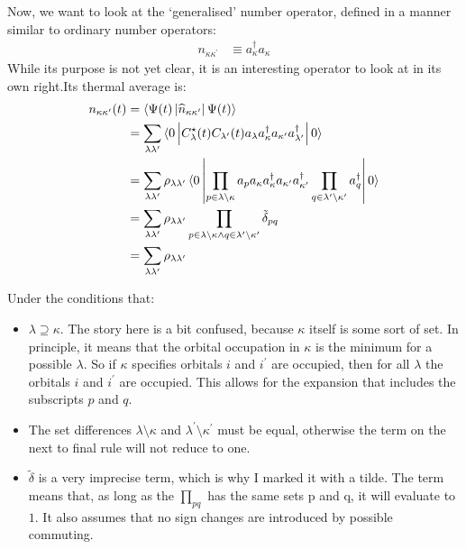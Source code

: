 Now, we want to look at the `generalised' number operator, defined in a manner similar to ordinary number operators: 
\begin{align}
n_{\kappa\kappa^\prime} &\equiv a^\dagger_\kappa a_\kappa \label{eq:gennum}
\end{align}
While its purpose is not yet clear, it is an interesting operator to look at in its own right.Its thermal average is:
\begin{align*}
n_{\kappa\kappa^\prime} (t) &= \braket{\Psi (t) \left| \widehat{n}_{\kappa\kappa^\prime}\right|\Psi (t)} \\
&=\sum_{\lambda\lambda^\prime} \braket{0\left| C_\lambda^\star (t) C_{\lambda^\prime} (t) a_\lambda a_\kappa^\dagger a_{\kappa^\prime} a_{\lambda^\prime}^\dagger \right|0}
\\
&= \sum_{\lambda\lambda^\prime} \rho_{\lambda\lambda^\prime} \braket{0\left| \prod_{p \in \lambda\setminus{\kappa}} a_p a_\kappa a_\kappa^\dagger a_{\kappa^\prime} a_{\kappa^\prime}^\dagger \prod_{q \in \lambda^\prime\setminus{\kappa^\prime}}a_q^\dagger \right|0}
\\
&= \sum_{\lambda\lambda^\prime} \rho_{\lambda\lambda^\prime} \prod_{p \in \lambda\setminus{\kappa} \wedge q \in \lambda^\prime\setminus{\kappa^\prime}} \tilde{\delta}_{pq}
\\
&=  \sum_{\lambda\lambda^\prime} \rho_{\lambda\lambda^\prime}
\end{align*}

Under the conditions that:
\begin{itemize}
\item $\lambda\supseteq\kappa$. The story here is a bit confused, because $\kappa$ itself is some sort of set. In principle, it means that the orbital occupation in $\kappa$ is the minimum for a possible $\lambda$. So if $\kappa$ specifies orbitals $i$ and $i^\prime$ are occupied, then for all $\lambda$ the orbitals $i$ and $i^\prime$ are occupied. This allows for the expansion that includes the subscripts $p$ and $q$.
\item The set differences $\lambda\setminus{\kappa}$ and $\lambda^\prime\setminus{\kappa^\prime}$ must be equal, otherwise the term on the next to final rule will not reduce to one. 
\item $\tilde{\delta}$ is a very imprecise term, which is why I marked it with a tilde. The term means that, as long as the $\prod_{pq}$ has the same sets p and q, it will evaluate to $1$. It also assumes that no sign changes are introduced by possible commuting.
\end{itemize}

